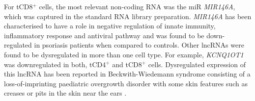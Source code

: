 For tCD8$^+$ cells, the most relevant non-coding RNA was the miR \textit{MIR146A}, which was captured in the standard RNA library preparation. \textit{MIR146A} has been characterised to have a role in negative regulation of innate immunity, inflammatory response and antiviral pathway and was found to be down-regulated in psoriasis patients when compared to controls. %
Other lncRNAs were found to be dysregulated in more than one cell type. For example, \textit{KCNQ1OT1} was downregulated in both, tCD4$^+$ and tCD8$^+$ cells. Dysregulated expression of this lncRNA has been reported in Beckwith-Wiedemann syndrome consisting of a loss-of-imprinting paediatric overgrowth disorder with some skin features such as creases or pits in the skin near the ears \parencite{Pandei2008}.






